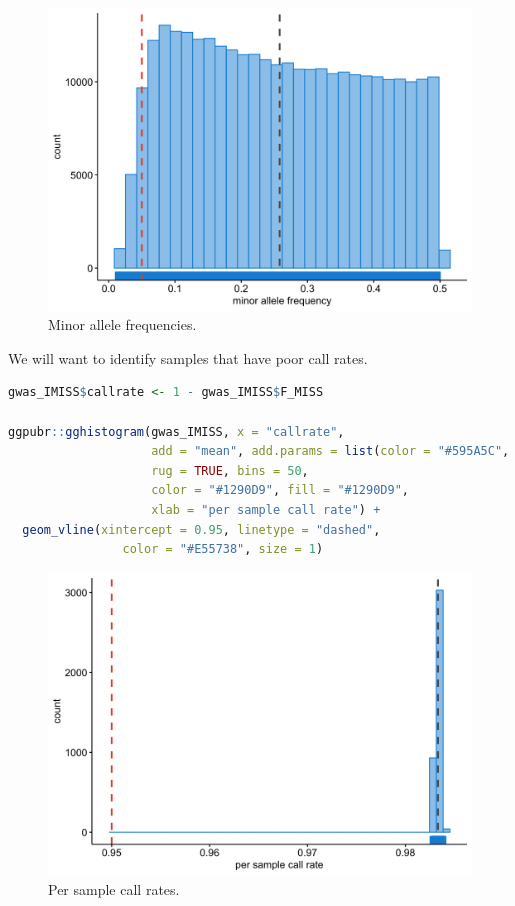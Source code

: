 \documentclass[
]{book}
\begin{document}
\begin{figure}

{\centering \includegraphics[width=18.67in]{img/_gwas/show-freq-gwas} 

}

\caption{Minor allele frequencies.}\label{fig:show-freq-gwas}
\end{figure}

We will want to identify samples that have poor call rates.

\begin{lstlisting}[language=R]
gwas_IMISS$callrate <- 1 - gwas_IMISS$F_MISS

ggpubr::gghistogram(gwas_IMISS, x = "callrate",
                    add = "mean", add.params = list(color = "#595A5C", linetype = "dashed", size = 1),
                    rug = TRUE, bins = 50,
                    color = "#1290D9", fill = "#1290D9",
                    xlab = "per sample call rate") +
  geom_vline(xintercept = 0.95, linetype = "dashed",
                color = "#E55738", size = 1)
\end{lstlisting}

\begin{figure}

{\centering \includegraphics[width=18.67in]{img/_gwas/show-sample-callrate-gwas} 

}

\caption{Per sample call rates.}\label{fig:show-sample-callrate-gwas}
\end{figure}
\end{document}
